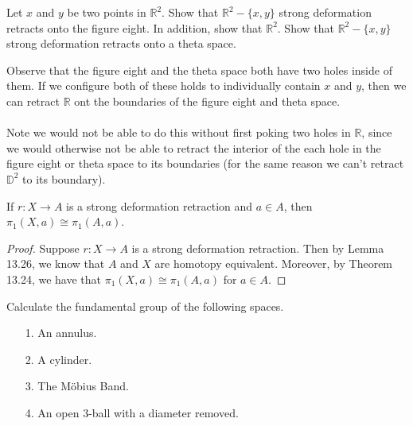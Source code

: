 \documentclass[a4paper,12pt,twoside]{hmcpset}
\begin{document}
\begin{exercise}[Exercise 13.28]
Let $x$ and $y$ be two points in $\mathbb{R}^2$. Show that
$\mathbb{R}^2 - \{x, y\}$ strong deformation retracts onto the figure
eight. In addition, show that $\mathbb{R}^2$. Show that
$\mathbb{R}^2 - \{x, y\}$ strong deformation retracts onto a theta
space.
\end{exercise}

\begin{solution}
Observe that the figure eight and the theta space both have two holes
inside of them. If we configure both of these holds to individually
contain $x$ and $y$, then we can retract $\mathbb{R}$ ont the
boundaries of the figure eight and theta space. 
\\
\\
Note we would not be able to do this without first poking two holes in
$\mathbb{R}$, since we would otherwise not be able to retract the
interior of the each hole in the figure eight or theta space to its
boundaries (for the same reason we can't retract $\mathbb{D}^2$ to its
boundary).
\end{solution}
    
\begin{problem}[Theorem 13.29]
    If $r : X \to A$ is a strong deformation retraction and $a \in A$,
    then $\pi_1(X, a) \cong \pi_1(A, a)$.
\end{problem}

\begin{proof}
    Suppose $r: X \to A$ is a strong deformation retraction. Then by
    Lemma 13.26, we know that $A$ and $X$ are homotopy equivalent.
    Moreover, by Theorem 13.24, we have that $\pi_1(X,a) \cong
    \pi_1(A, a)$ for $a \in A$. 
\end{proof}

\begin{exercise}[Exercise 13.30]
    Calculate the fundamental group of the following spaces.
    \begin{itemize}
        \item[1.] An annulus.
        \item[2.] A cylinder.
        \item[3.] The Möbius Band.
        \item[4.] An open 3-ball with a diameter removed.   
    \end{itemize}
\end{exercise}
\end{document}
